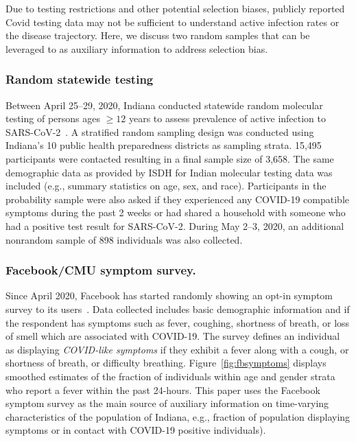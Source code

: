 \documentclass[11pt]{amsart}
\numberwithin{equation}{section}
\theoremstyle{plain}
\begin{document}
Due to testing restrictions and other potential selection biases, publicly reported Covid testing data may not be sufficient to understand active infection rates or the disease trajectory.  Here, we discuss two random samples that can be leveraged to as auxiliary information to address selection bias.

\subsubsection{Random statewide testing}

Between April 25--29, 2020, Indiana conducted statewide random molecular testing of persons ages $\geq 12$ years to assess prevalence of active infection to SARS-CoV-2~\citep{Yiannoutsos2021}. A stratified random sampling design was conducted using Indiana’s 10 public health preparedness districts as sampling strata. 15,495 participants were contacted resulting in a final sample size of 3,658. The same demographic data as provided by ISDH for Indian molecular testing data was included (e.g., summary statistics on age, sex, and race). Participants in the probability sample were also asked if they experienced any COVID-19 compatible symptoms during the past 2 weeks or had shared a household with someone who had a positive test result for SARS-CoV-2. During May 2--3, 2020, an additional nonrandom sample of 898 individuals was also collected.

\subsubsection{Facebook/CMU symptom survey.}
\label{subsection:fbsymptom}
Since April 2020, Facebook has started randomly showing an opt-in symptom survey to its users~\citep{delphisurvey}.  Data collected includes basic demographic information and if the respondent has symptoms such as fever, coughing, shortness of breath, or loss of smell which are associated with COVID-19.  The survey defines an individual as displaying \emph{COVID-like symptoms} if they exhibit a fever along with a cough, or shortness of breath, or difficulty breathing.  Figure~\ref{fig:fbsymptoms} displays smoothed estimates of the fraction of individuals within age and gender strata who report a fever within the past 24-hours.  This paper uses the Facebook symptom survey as the main source of auxiliary information on time-varying characteristics of the population of Indiana, e.g., fraction of population displaying symptoms or in contact with COVID-19 positive individuals).
\end{document}
